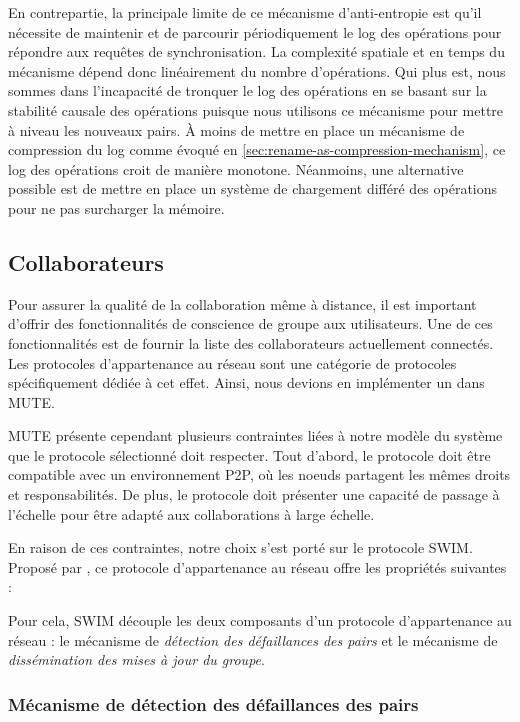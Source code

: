 \documentclass[12pt]{thesul}
\begin{document}
En contrepartie, la principale limite de ce mécanisme d'anti-entropie est qu'il nécessite de maintenir et de parcourir périodiquement le log des opérations pour répondre aux requêtes de synchronisation.
La complexité spatiale et en temps du mécanisme dépend donc linéairement du nombre d'opérations.
Qui plus est, nous sommes dans l'incapacité de tronquer le log des opérations en se basant sur la stabilité causale des opérations puisque nous utilisons ce mécanisme pour mettre à niveau les nouveaux pairs.
À moins de mettre en place un mécanisme de compression du log comme évoqué en \autoref{sec:rename-as-compression-mechanism}, ce log des opérations croit de manière monotone.
Néanmoins, une alternative possible est de mettre en place un système de chargement différé des opérations pour ne pas surcharger la mémoire.

\subsection{Collaborateurs}

Pour assurer la qualité de la collaboration même à distance, il est important d'offrir des fonctionnalités de conscience de groupe aux utilisateurs.
Une de ces fonctionnalités est de fournir la liste des collaborateurs actuellement connectés.
Les protocoles d'appartenance au réseau sont une catégorie de protocoles spécifiquement dédiée à cet effet.
Ainsi, nous devions en implémenter un dans MUTE.

MUTE présente cependant plusieurs contraintes liées à notre modèle du système que le protocole sélectionné doit respecter.
Tout d'abord, le protocole doit être compatible avec un environnement \ac{P2P}, où les noeuds partagent les mêmes droits et responsabilités.
De plus, le protocole doit présenter une capacité de passage à l'échelle pour être adapté aux collaborations à large échelle.

En raison de ces contraintes, notre choix s'est porté sur le protocole SWIM\cite{swim2002}.
Proposé par \citeauthor{swim2002}, ce protocole d'appartenance au réseau offre les propriétés suivantes :


Pour cela, SWIM découple les deux composants d'un protocole d'appartenance au réseau : le mécanisme de \emph{détection des défaillances des pairs} et le mécanisme de \emph{dissémination des mises à jour du groupe}.

\subsubsection{Mécanisme de détection des défaillances des pairs}
\end{document}
